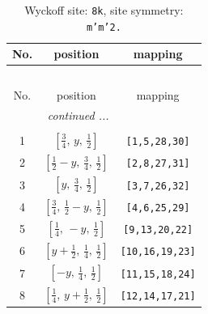 \documentclass[fleqn,8pt]{jsarticle}
\begin{document}
\begin{longtable}{ccc}
\caption{Wyckoff site: {\tt 8k}, site symmetry: {\tt m'm'2.}}
 \\
 \hline \hline
No. & position & mapping \\ \hline \endfirsthead

\multicolumn{2}{l}{\tablename\ \thetable{}} \\
 \hline \hline
No. & position & mapping \\ \hline \endhead

 \hline \hline
\multicolumn{2}{r}{\footnotesize\it continued ...} \\ \endfoot

 \hline \hline
\multicolumn{2}{r}{} \\ \endlastfoot

1 & $\left[ \frac{3}{4},\, y,\, \frac{1}{2} \right]$ & {\tt [1,5,28,30]} \\ \hline
2 & $\left[ \frac{1}{2} - y,\, \frac{3}{4},\, \frac{1}{2} \right]$ & {\tt [2,8,27,31]} \\ \hline
3 & $\left[ y,\, \frac{3}{4},\, \frac{1}{2} \right]$ & {\tt [3,7,26,32]} \\ \hline
4 & $\left[ \frac{3}{4},\, \frac{1}{2} - y,\, \frac{1}{2} \right]$ & {\tt [4,6,25,29]} \\ \hline
5 & $\left[ \frac{1}{4},\, - y,\, \frac{1}{2} \right]$ & {\tt [9,13,20,22]} \\ \hline
6 & $\left[ y + \frac{1}{2},\, \frac{1}{4},\, \frac{1}{2} \right]$ & {\tt [10,16,19,23]} \\ \hline
7 & $\left[ - y,\, \frac{1}{4},\, \frac{1}{2} \right]$ & {\tt [11,15,18,24]} \\ \hline
8 & $\left[ \frac{1}{4},\, y + \frac{1}{2},\, \frac{1}{2} \right]$ & {\tt [12,14,17,21]} \\
\end{longtable}
\renewcommand{\arraystretch}{1.2}
\end{document}
